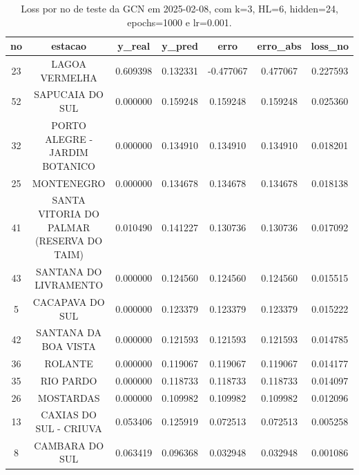 \begin{table}[h]
\centering
\caption{Loss por no de teste da GCN em 2025-02-08, com k=3, HL=6, hidden=24, epochs=1000 e lr=0.001.}
\label{tab:gcn_loss_k3_hl6_h24_e1000_d20250208}
\begin{tabular}{ccccccc}
\toprule
no & estacao & y\_real & y\_pred & erro & erro\_abs & loss\_no \\
\midrule
23 & LAGOA VERMELHA & 0.609398 & 0.132331 & -0.477067 & 0.477067 & 0.227593 \\
52 & SAPUCAIA DO SUL & 0.000000 & 0.159248 & 0.159248 & 0.159248 & 0.025360 \\
32 & PORTO ALEGRE - JARDIM BOTANICO & 0.000000 & 0.134910 & 0.134910 & 0.134910 & 0.018201 \\
25 & MONTENEGRO & 0.000000 & 0.134678 & 0.134678 & 0.134678 & 0.018138 \\
41 & SANTA VITORIA DO PALMAR (RESERVA DO TAIM) & 0.010490 & 0.141227 & 0.130736 & 0.130736 & 0.017092 \\
43 & SANTANA DO LIVRAMENTO & 0.000000 & 0.124560 & 0.124560 & 0.124560 & 0.015515 \\
5 & CACAPAVA DO SUL & 0.000000 & 0.123379 & 0.123379 & 0.123379 & 0.015222 \\
42 & SANTANA DA BOA VISTA & 0.000000 & 0.121593 & 0.121593 & 0.121593 & 0.014785 \\
36 & ROLANTE & 0.000000 & 0.119067 & 0.119067 & 0.119067 & 0.014177 \\
35 & RIO PARDO & 0.000000 & 0.118733 & 0.118733 & 0.118733 & 0.014097 \\
26 & MOSTARDAS & 0.000000 & 0.109982 & 0.109982 & 0.109982 & 0.012096 \\
13 & CAXIAS DO SUL - CRIUVA & 0.053406 & 0.125919 & 0.072513 & 0.072513 & 0.005258 \\
8 & CAMBARA DO SUL & 0.063419 & 0.096368 & 0.032948 & 0.032948 & 0.001086 \\
\bottomrule
\end{tabular}
\end{table}
